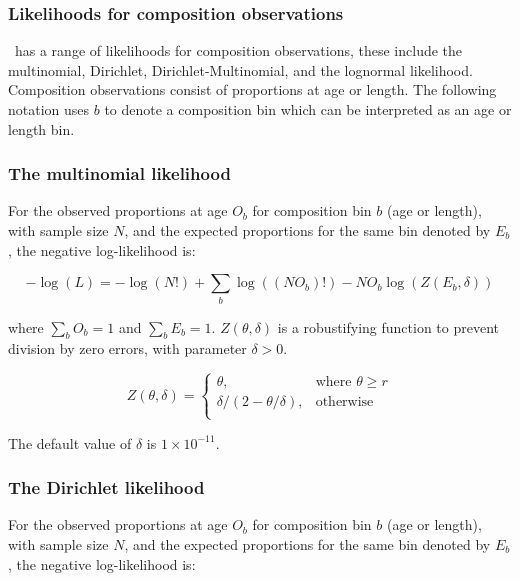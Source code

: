 \subsubsection{Likelihoods for composition observations}

\CNAME\ has a range of likelihoods for composition observations, these include the multinomial, Dirichlet, Dirichlet-Multinomial, and the lognormal likelihood. Composition observations consist of proportions at age or length. The following notation uses \(b\) to denote a composition bin which can be interpreted as an age or length bin.

\subsubsection*{The multinomial likelihood}

For the observed proportions at age $O_b$ for composition bin $b$ (age or length), with sample size $N$, and the expected proportions for the same bin denoted by $E_b$, the negative log-likelihood is:

\begin{equation}
-\log \left(L \right) =  -\log \left(N! \right) + \sum\limits_b\log \left( \left(NO_b \right)! \right) - NO_b \log \left(Z \left(E_b,\delta \right) \right)
\end{equation}

where $\sum\limits_b O_b = 1$ and $\sum\limits_b E_b = 1$. $Z \left(\theta,\delta \right)$ is a robustifying function to prevent division by zero errors, with parameter $\delta>0$.

\begin{equation}
Z \left(\theta,\delta \right) = \begin{cases}
\theta, & \text{where $\theta \ge r$} \\
\delta/\left( 2-\theta/\delta \right), & \text{otherwise} \\
\end{cases}
\end{equation}

The default value of $\delta$ is $1 \times 10^{-11}$.

\subsubsection*{The Dirichlet likelihood}

For the observed proportions at age $O_b$ for composition bin $b$ (age or length), with sample size $N$, and the expected proportions for the same bin denoted by $E_b$, the negative log-likelihood is:

